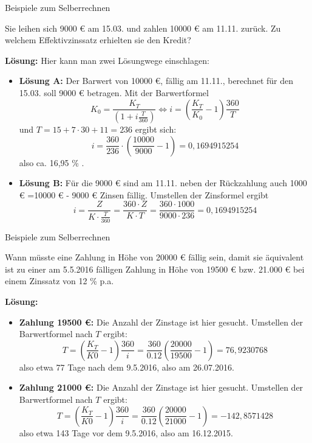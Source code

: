 \begin{frame}{Beispiele zum Selberrechnen}
\footnotesize{		\begin{example}
			Sie leihen sich 9000 € am 15.03. und zahlen 10000 € am 11.11. zurück. Zu welchem Effektivzinssatz erhielten sie den Kredit?
			
			\textbf{Lösung:} Hier kann man zwei Lösungwege einschlagen:
			\begin{itemize}
				\item \textbf{Lösung A:} Der Barwert von 10000 €, fällig am 11.11., berechnet für den 15.03. soll 9000 € betragen. Mit der Barwertformel
				\[
					K_{0} = \frac{K_{T}}{\left(1 + i \frac{T}{360}\right)} \Leftrightarrow i = \left(\frac{K_{T}}{K_{0}} - 1 \right) \frac{360}{T}  
				\] 
				und $T =  15 + 7 \cdot 30 + 11 = 236$ ergibt sich:
				\[
				i = \frac{360}{236} \cdot \left( \frac{10000}{9000} - 1  \right) = 0,1694915254
				\]
				also ca. 16,95 \% .
				\item \textbf{Lösung B:} Für die 9000 € sind am 11.11. neben der Rückzahlung auch 1000 €  =10000 € - 9000 € Zinsen fällig. Umstellen der Zinsformel ergibt
				\[
				i = \frac{Z}{K \cdot \frac{T}{360}} = \frac{360 \cdot Z}{K \cdot T} = \frac{360 \cdot 1000}{9000 \cdot 236} = 0,1694915254
				\] 		
			\end{itemize} 
		\end{example}	}	
\end{frame}

\begin{frame}{Beispiele zum Selberrechnen}
\small{	\begin{example}
		Wann müsste eine Zahlung in Höhe von 20000 € fällig sein, damit sie äquivalent ist zu einer am 5.5.2016 fälligen Zahlung in Höhe von 19500 € bzw. 21.000 € bei einem Zinssatz von 12 \% p.a. 
		
		\textbf{Lösung:} 
		\begin{itemize}
 			\item \textbf{Zahlung 19500 €:} Die Anzahl der Zinstage ist hier gesucht. Umstellen der Barwertformel nach $T$ ergibt:
 			\[
 			T = \left( \frac{K_{T}}{K{0}} - 1 \right) \frac{360}{i} = \frac{360}{0.12} \left( \frac{20000}{19500} - 1\right) = 76,9230768
 			\]
 			also etwa 77 Tage nach dem 9.5.2016, also am 26.07.2016.
			
			\item \textbf{Zahlung 21000 €:} Die Anzahl der Zinstage ist hier gesucht. Umstellen der Barwertformel nach $T$ ergibt:
			\[
			T = \left( \frac{K_{T}}{K{0}} - 1 \right) \frac{360}{i} = \frac{360}{0.12} \left( \frac{20000}{21000} - 1\right) = -142,8571428
 			\]
 			also etwa 143 Tage vor dem 9.5.2016, also am 16.12.2015.		
		\end{itemize} 

	\end{example}}		
\end{frame}


